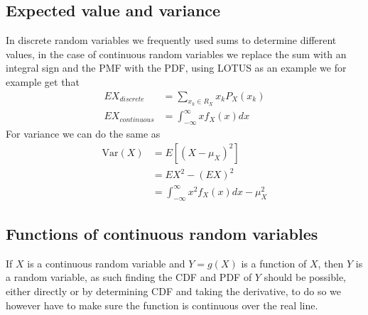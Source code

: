 \subsection{Expected value and variance}
In discrete random variables we frequently used sums to determine different values, in the case of continuous random variables we replace the sum with an integral sign and the PMF with the PDF, using LOTUS as an example we for example get that
\begin{align*}
    EX_{discrete}&=\sum_{x_{k}\in R_{X}}x_{k}P_{X}(x_{k}) \\
    EX_{continuous}&=\int_{-\infty}^{\infty}xf_{X}(x)dx
\end{align*}
For variance we can do the same as
\begin{align*}
    \text{Var}(X)&=E[(X-\mu_{X})^{2}]\\
             &=EX^{2}-(EX)^{2} \\
             &=\int_{-\infty}^{\infty}x^{2}f_{X}(x)dx-\mu_{X}^{2}
\end{align*}
\subsection{Functions of continuous random variables}
If $X$ is a continuous random variable and $Y=g(X)$ is a function of $X$, then $Y$ is a random variable, as such finding the CDF and PDF of $Y$ should be possible, either directly or by determining CDF and taking the derivative, to do so we however have to make sure the function is continuous over the real line.

